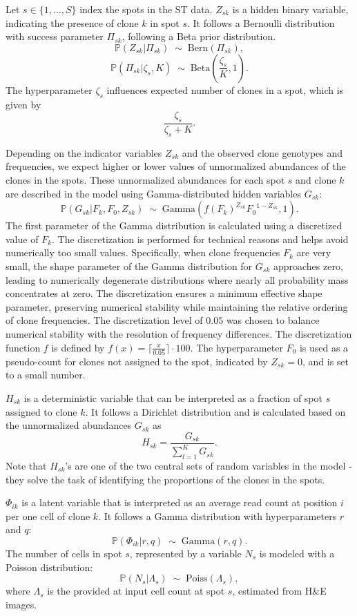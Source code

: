 \documentclass[unnumsec,webpdf,contemporary,large]{oup-authoring-template}%
\theoremstyle{thmstyleone}%
\theoremstyle{thmstyletwo}%
\theoremstyle{thmstylethree}%
\newcommand{\rev}[1]{{\color{revisionblue}#1}}
\begin{document}
\begin{methods}
Let $s \in \{1, \ldots, S\}$ index the spots in the ST data. $Z_{sk}$ is a hidden binary variable, indicating the presence of clone $k$ in spot $s$. It follows a Bernoulli distribution with success parameter   $\Pi_{sk}$, following a Beta prior distribution.
$$\mathbb{P}(Z_{sk}|\Pi_{sk}) \; \sim \; \mathrm{Bern}(\Pi_{sk}),$$
$$\mathbb{P}(\Pi_{sk}|\zeta_s,K) \; \sim \; \mathrm{Beta}\left(\frac{\zeta_s}{K},1\right).$$
The hyperparameter $\zeta_s$ influences expected number of clones in a spot, which is given by $$\frac{\zeta_s}{\zeta_s+K}.$$

Depending on the indicator variables $Z_{sk}$ and the observed clone genotypes and frequencies, we expect higher or lower values of unnormalized abundances of the clones in the spots. These unnormalized abundances for each spot $s$ and clone $k$ are described in the model using Gamma-distributed hidden variables $G_{sk}:$
$$\mathbb{P}(G_{sk} | F_k, F_0, Z_{sk}) \; \sim \; \mathrm{Gamma}({f(F_{k})}^{Z_{sk}}{F_{0}}^{1-Z_{sk}},1).$$
The first parameter of the Gamma distribution is calculated using a discretized value of $F_k$. The discretization is performed for technical reasons and helps avoid numerically too small values. \rev{Specifically, when clone frequencies $F_k$ are very small, the shape parameter of the Gamma distribution for $G_{sk}$ approaches zero, leading to numerically degenerate distributions where nearly all probability mass concentrates at zero. The discretization ensures a minimum effective shape parameter, preserving numerical stability while maintaining the relative ordering of clone frequencies. The discretization level of $0.05$ was chosen to balance numerical stability with the resolution of frequency differences.} The discretization function $f$ is  defined by $f(x) = \lceil \frac{x}{0.05}\rceil \cdot 100$. The hyperparameter $F_0$ is used as a pseudo-count for clones not assigned to the spot, indicated by $Z_{sk}=0$, and is set to a small number.

$H_{sk}$ is a deterministic variable that can be interpreted as a fraction of spot $s$ assigned to clone $k$. It follows a Dirichlet distribution and is calculated based on the unnormalized abundances $G_{sk}$ as $$H_{sk} = \frac{G_{sk}}{\sum_{l=1}^{K} G_{sk}}.$$
Note that $H_{sk}$'s are one of the two central sets of random variables in the model - they solve the task of identifying the proportions of the clones in the spots.

$\Phi_{ik}$ is a latent variable that is interpreted as an average read count at position $i$ per one cell of clone $k$. It follows a Gamma distribution with hyperparameters $r$ and $q$:
$$\mathbb{P}(\Phi_{ik}|r,q) \; \sim \; \mathrm{Gamma}(r,q).$$
The number of cells in spot $s$, represented by a variable $N_s$ is modeled with a Poisson distribution:
$$\mathbb{P}(N_s|\Lambda_s) \; \sim \; \mathrm{Poiss}(\Lambda_s),$$
where $\Lambda_s$ is the provided at input  cell count at spot $s$, estimated from H\&E images.


\end{methods}
\end{document}
